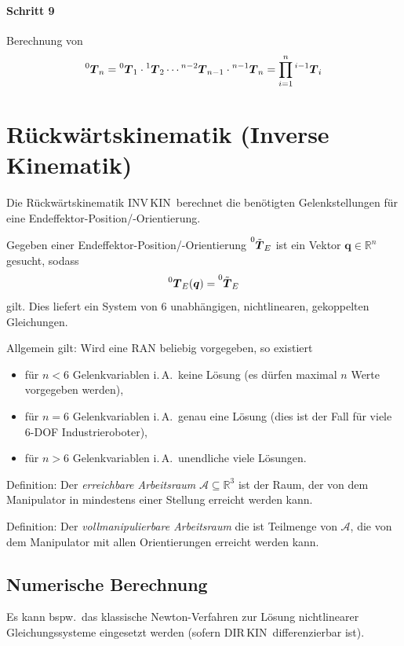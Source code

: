 \documentclass[a4paper, 11pt, accentcolor = tud3b]{tudreport}
\newcommand{\R}{\mathbb{R}}
\newcommand{\inreferenceto}[2]{\prescript{#1}{}{#2}}
\newcommand{\mat}[1]{\boldsymbol{#1}}
\renewcommand{\vec}[1]{\boldsymbol{#1}}
\newcommand{\bspw}{bspw.~}
\newcommand{\iA}{i.\,A.~}
\newcommand{\DIRKIN}{DIR\,KIN~}
\newcommand{\INVKIN}{INV\,KIN~}
\begin{document}
					\paragraph{Schritt 9}
						Berechnung von
						\begin{equation*}
							\inreferenceto{0}{\mat{T}}_n = \inreferenceto{0}{\mat{T}}_1 \cdot \inreferenceto{1}{\mat{T}}_2 \cdots \inreferenceto{n - 2}{\mat{T}}_{n - 1} \cdot \inreferenceto{n - 1}{\mat{T}}_{n} = \prod_{i = 1}^{n} \inreferenceto{i - 1}{\mat{T}}_i
						\end{equation*}

		\section{Rückwärtskinematik (Inverse Kinematik)}
			Die Rückwärtskinematik \INVKIN berechnet die benötigten Gelenkstellungen für eine Endeffektor-Position/-Orientierung.
			
			Gegeben einer Endeffektor-Position/-Orientierung \( \inreferenceto{0}{\tilde{\mat{T}}}_E \) ist ein Vektor \( \vec{q} \in \R^n \) gesucht, sodass
			\begin{equation*}
				\inreferenceto{0}{\mat{T}}_E(\vec{q}) = \inreferenceto{0}{\tilde{\mat{T}}}_E
			\end{equation*}
			gilt. Dies liefert ein System von \(6\) unabhängigen, nichtlinearen, gekoppelten Gleichungen.
			
			Allgemein gilt: Wird eine RAN beliebig vorgegeben, so existiert
			\begin{itemize}
				\item für \( n < 6 \) Gelenkvariablen \iA keine Lösung (es dürfen maximal \(n\) Werte vorgegeben werden),
				\item für \( n = 6 \) Gelenkvariablen \iA genau eine Lösung (dies ist der Fall für viele \num{6}-DOF Industrieroboter),
				\item für \( n > 6 \) Gelenkvariablen \iA unendliche viele Lösungen.
			\end{itemize}
		
			Definition: Der \emph{erreichbare Arbeitsraum} \(\mathcal{A} \subseteq \R^3\) ist der Raum, der von dem Manipulator in mindestens einer Stellung erreicht werden kann.
			
			Definition: Der \emph{vollmanipulierbare Arbeitsraum} die ist Teilmenge von \(\mathcal{A}\), die von dem Manipulator mit allen Orientierungen erreicht werden kann.

			\subsection{Numerische Berechnung}
				Es kann \bspw das klassische Newton-Verfahren zur Lösung nichtlinearer Gleichungssysteme eingesetzt werden (sofern \DIRKIN differenzierbar ist).
				
\end{document}
